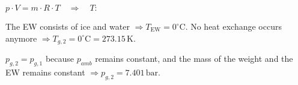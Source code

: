\( p \cdot V = m \cdot R \cdot T \quad \Rightarrow \quad T: \)  

The EW consists of ice and water \( \Rightarrow T_{\text{EW}} = 0^\circ \text{C} \).  
No heat exchange occurs anymore \( \Rightarrow T_{g,2} = 0^\circ \text{C} = 273.15 \, \text{K} \).  

\( p_{g,2} = p_{g,1} \) because \( p_{amb} \) remains constant, and the mass of the weight and the EW remains constant \( \Rightarrow p_{g,2} = 7.401 \, \text{bar} \).